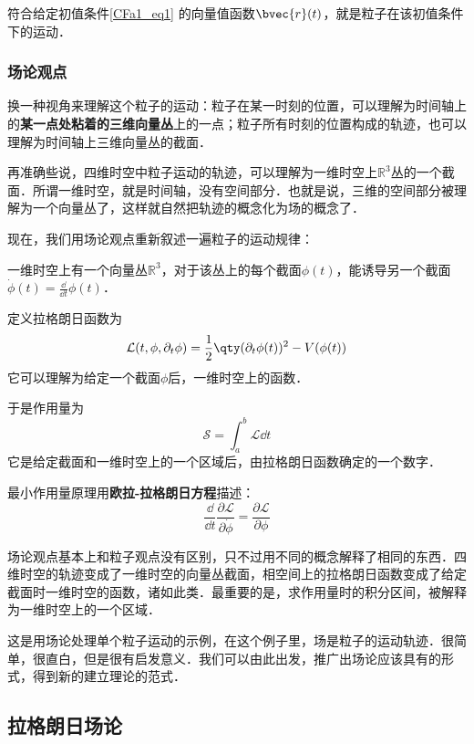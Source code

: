 符合给定初值条件\autoref{CFa1_eq1} 的向量值函数$\bvec{r}(t)$，就是粒子在该初值条件下的运动．


\subsubsection{场论观点}

换一种视角来理解这个粒子的运动：粒子在某一时刻的位置，可以理解为时间轴上的\textbf{某一点处粘着的三维向量丛}上的一点；粒子所有时刻的位置构成的轨迹，也可以理解为时间轴上三维向量丛的截面．

再准确些说，四维时空中粒子运动的轨迹，可以理解为一维时空上$\mathbb{R}^3$丛的一个截面．所谓一维时空，就是时间轴，没有空间部分．也就是说，三维的空间部分被理解为一个向量丛了，这样就自然把轨迹的概念化为场的概念了．

现在，我们用场论观点重新叙述一遍粒子的运动规律：

一维时空上有一个向量丛$\mathbb{R}^3$，对于该丛上的每个截面$\phi(t)$，能诱导另一个截面$\dot{\phi}(t)=\frac{\dd}{\dd t}\phi(t)$．

定义拉格朗日函数为
\begin{equation}\label{CFa1_eq2}
\mathcal{L}(t, \phi, \partial_t\phi) = \frac{1}{2}\qty(\partial_t \phi(t))^2 - V(\phi(t))
\end{equation}
它可以理解为给定一个截面$\phi$后，一维时空上的函数．

于是作用量为
\begin{equation}\label{CFa1_eq4}
\mathcal{S}=\int_a^b \mathcal{L}\dd t
\end{equation}
它是给定截面和一维时空上的一个区域后，由拉格朗日函数确定的一个数字．

最小作用量原理用\textbf{欧拉-拉格朗日方程}描述：
\begin{equation}
\frac{\dd}{\dd t}\frac{\partial\mathcal{L}}{\partial\dot{\phi}} = \frac{\partial \mathcal{L}}{\partial\phi}
\end{equation}

场论观点基本上和粒子观点没有区别，只不过用不同的概念解释了相同的东西．四维时空的轨迹变成了一维时空的向量丛截面，相空间上的拉格朗日函数变成了给定截面时一维时空的函数，诸如此类．最重要的是，求作用量时的积分区间，被解释为一维时空上的一个区域．

这是用场论处理单个粒子运动的示例，在这个例子里，场是粒子的运动轨迹．很简单，很直白，但是很有启发意义．我们可以由此出发，推广出场论应该具有的形式，得到新的建立理论的范式．


\subsection{拉格朗日场论}

